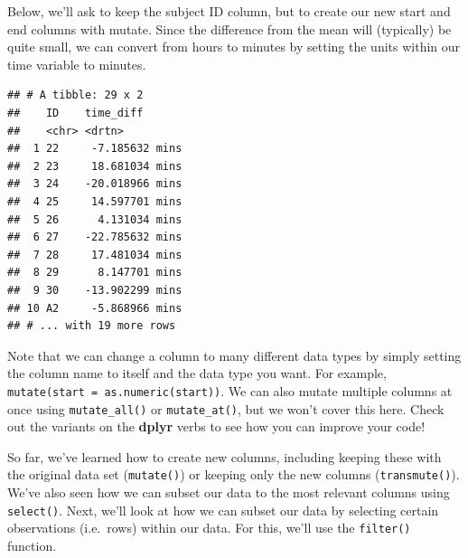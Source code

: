 \documentclass[
]{book}
\newenvironment{Shaded}{\begin{snugshade}}{\end{snugshade}}
\newcommand{\AttributeTok}[1]{\textcolor[rgb]{0.77,0.63,0.00}{#1}}
\newcommand{\CommentTok}[1]{\textcolor[rgb]{0.56,0.35,0.01}{\textit{#1}}}
\newcommand{\FunctionTok}[1]{\textcolor[rgb]{0.00,0.00,0.00}{#1}}
\newcommand{\NormalTok}[1]{#1}
\newcommand{\OtherTok}[1]{\textcolor[rgb]{0.56,0.35,0.01}{#1}}
\newcommand{\SpecialCharTok}[1]{\textcolor[rgb]{0.00,0.00,0.00}{#1}}
\newcommand{\StringTok}[1]{\textcolor[rgb]{0.31,0.60,0.02}{#1}}
\begin{document}
Below, we'll ask to keep the subject ID column, but to create our new start and end columns with mutate. Since the difference from the mean will (typically) be quite small, we can convert from hours to minutes by setting the units within our time variable to minutes.

\begin{Shaded}
\end{Shaded}

\begin{verbatim}
## # A tibble: 29 x 2
##    ID    time_diff      
##    <chr> <drtn>         
##  1 22     -7.185632 mins
##  2 23     18.681034 mins
##  3 24    -20.018966 mins
##  4 25     14.597701 mins
##  5 26      4.131034 mins
##  6 27    -22.785632 mins
##  7 28     17.481034 mins
##  8 29      8.147701 mins
##  9 30    -13.902299 mins
## 10 A2     -5.868966 mins
## # ... with 19 more rows
\end{verbatim}

Note that we can change a column to many different data types by simply setting the column name to itself and the data type you want. For example, \texttt{mutate(start\ =\ as.numeric(start))}. We can also mutate multiple columns at once using \texttt{mutate\_all()} or \texttt{mutate\_at()}, but we won't cover this here. Check out the variants on the \textbf{dplyr} verbs to see how you can improve your code!

So far, we've learned how to create new columns, including keeping these with the original data set (\texttt{mutate()}) or keeping only the new columns (\texttt{transmute()}). We've also seen how we can subset our data to the most relevant columns using \texttt{select()}. Next, we'll look at how we can subset our data by selecting certain observations (i.e.~rows) within our data. For this, we'll use the \texttt{filter()} function.
\end{document}
